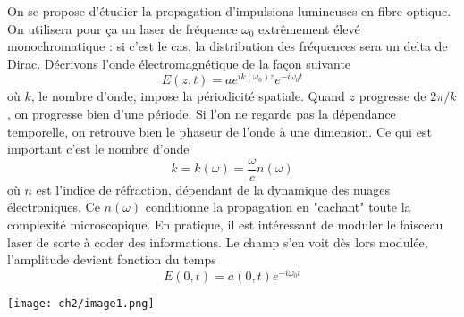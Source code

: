 On se propose d'étudier la propagation d'impulsions lumineuses en fibre optique. On utilisera 
pour ça un laser de fréquence $\omega_0$ extrêmement élevé monochromatique : si c'est le cas, 
la distribution des fréquences sera un delta de Dirac. Décrivons l'onde électromagnétique de 
la façon suivante
\begin{equation}
E(z,t) = ae^{ik(\omega_0)z}e^{-i\omega_0t}
\end{equation}
où $k$, le nombre d'onde, impose la périodicité spatiale. Quand $z$ progresse de $2\pi/k$, on 
progresse bien d'une période. Si l'on ne regarde pas la dépendance temporelle, on retrouve bien 
le phaseur de l'onde à une dimension. Ce qui est important c'est le nombre d'onde
\begin{equation}
k = k(\omega) = \frac{\omega}{c}n(\omega)
\end{equation}
où $n$ est l'indice de réfraction, dépendant de la dynamique des nuages électroniques. Ce $n
(\omega)$ conditionne la propagation en "cachant" toute la complexité microscopique. En pratique, 
il est intéressant de moduler le faisceau laser de sorte à coder des informations. Le champ 
s'en voit dès lors modulée, l'amplitude devient fonction du temps
\begin{equation}
E(0,t) = a(0,t)e^{-i\omega_0t}
\end{equation}
\begin{center}
\texttt{[image: ch2/image1.png]}
\end{center}

